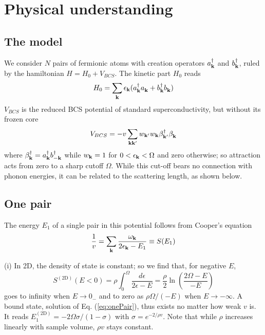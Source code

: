 \documentclass[5p,twocolumn]{elsarticle}
\begin{document}
\section{Physical understanding}
\subsection{The model\label{sec:model}}
We consider $N$ pairs of fermionic atoms with creation operators $a_{\mathbf{k}}^\dagger$ and $b_{\mathbf{k}}^\dagger$, ruled by the hamiltonian
$H=H_{0}+V_{BCS}$. The kinetic part $H_0$ reads 
\begin{equation}
H_0=\sum_{\mathbf{k}}\epsilon_{\mathbf{k}}(a^\dagger_{\mathbf{k}}{}a^{}_{\mathbf{k}}+b^\dagger_{\mathbf{k}}{}b^{}_{\mathbf{k}})
\label{eq:}
\end{equation}
 $V_{BCS}$ is the reduced BCS potential of standard superconductivity, but without its frozen core
\begin{equation}
V_{BCS}=-v\sum_{\mathbf{k}\mathbf{k}'}w_{\mathbf{k}'}w_{\mathbf{k}}\beta^\dagger_{\mathbf{k}'}{}\beta^{}_{\mathbf{k}}
\label{eq:VBcs}
\end{equation}
 where $\beta^\dagger_{\mathbf{k}}=a^\dagger_{\mathbf{k}}b^\dagger_{-\mathbf{k}}$ while $w_{\mathbf{k}}=1$ for $0<\epsilon_{\mathbf{k}}<\Omega$ and zero otherwise; so attraction acts from zero to a sharp cutoff $\Omega$. While this cut-off bears no connection with phonon energies, it can be related to the scattering length, as shown below.
 \subsection{One pair\label{sec:onePair}}
The energy $E_1$ of a single pair in this potential follows from Cooper's equation
\begin{equation}
\frac{1}{v}=\sum_{\mathbf{k}}\frac{\omega_{\mathbf{k}}}{2\epsilon_{\mathbf{k}}-E_1}\equiv{}S(E_1)
\label{eq:onePair}
\end{equation}

(i) In 2D, the density of state is constant; so we find that, for negative $E$, 
\begin{equation}
S^{(\text{2D})}(E<0)=\rho\int_0^{\Omega}\frac{d\epsilon}{2\epsilon-E}=\frac{\rho}{2}\ln\left(\frac{2\Omega-E}{-E}\right)
\label{eq:s1pair}
\end{equation}
goes to infinity when $E\rightarrow{}0_{-}$ and to zero as $\rho\Omega/(-E)$ when $E\rightarrow-\infty$. A bound state, solution of Eq. (\ref{eq:onePair}), thus exists no matter how weak $v$ is. It reads
$
E_1^{(\text{2D})}=-2\Omega\sigma/(1-\sigma)
$
with $\sigma=e^{-2/\rho{v}}$. Note that while $\rho$ increases linearly with sample volume, $\rho{v}$ stays constant.
\end{document}
